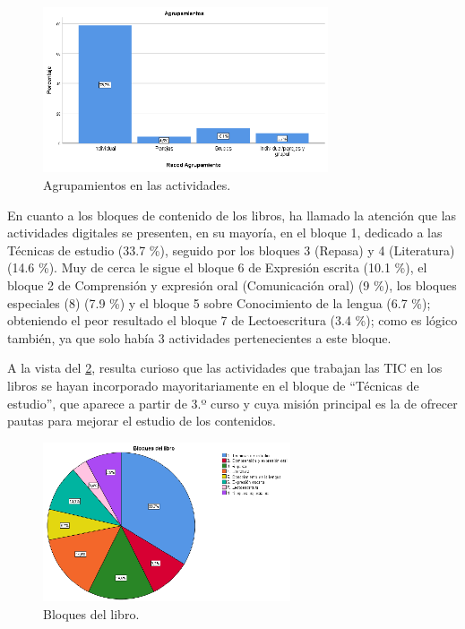\documentclass{textolivre}
\begin{document}
\begin{figure}[htb]
 \centering
 \includegraphics[width=0.75\textwidth]{Fig04.eps}
 \caption{Agrupamientos en las actividades.}
 \label{Fig04}
\end{figure}

En cuanto a los bloques de contenido de los libros, ha llamado la atención que las actividades digitales se presenten, en su mayoría, en el bloque 1, dedicado a las Técnicas de estudio (33.7 \%), seguido por los bloques 3 (Repasa) y 4 (Literatura) (14.6 \%). Muy de cerca le sigue el bloque 6 de Expresión escrita (10.1 \%), el bloque 2 de Comprensión y expresión oral (Comunicación oral) (9 \%), los bloques especiales (8) (7.9 \%) y el bloque 5 sobre Conocimiento de la lengua (6.7 \%); obteniendo el peor resultado el bloque 7 de Lectoescritura (3.4 \%); como es lógico también, ya que solo había 3 actividades pertenecientes a este bloque. 

A la vista del \cref{Fig05}, resulta curioso que las actividades que trabajan las TIC en los libros se hayan incorporado mayoritariamente en el bloque de “Técnicas de estudio”, que aparece a partir de 3.º curso y cuya misión principal es la de ofrecer pautas para mejorar el estudio de los contenidos. 

\begin{figure}[htb]
 \centering
 \includegraphics[width=0.65\textwidth]{Fig05.eps}
 \caption{Bloques del libro.}
 \label{Fig05}
\end{figure}
\end{document}
